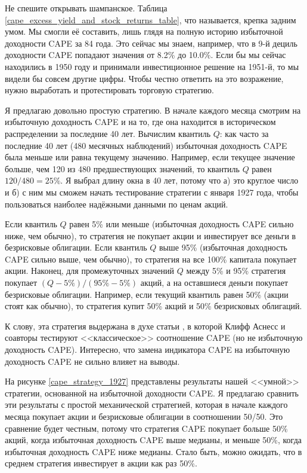 Не спешите открывать шампанское. Таблица 
\ref{cape_excess_yield_and_stock_returns_table}, что называется, крепка задним 
умом. Мы смогли её составить, лишь глядя на полную историю избыточной 
доходности CAPE за 84 года. Это сейчас мы знаем, например, что в 9-й дециль 
доходности CAPE попадают значения от 8.2\% до 10.0\%. Если бы мы сейчас 
находились в 1950 году и принимали инвестиционное решение на 1951-й, то мы 
видели бы совсем другие цифры. Чтобы честно ответить на это возражение, нужно 
выработать и протестировать торговую стратегию.

Я предлагаю довольно простую стратегию. В начале каждого месяца смотрим на 
избыточную доходность CAPE и на то, где она находится в историческом 
распределении за последние 40 лет. Вычислим квантиль $Q$: как часто за 
последние 40 лет (480 месячных наблюдений) избыточная доходность CAPE была 
меньше или равна текущему значению. Например, если текущее значение больше, 
чем 120 из 480 предшествующих значений, то квантиль $Q$ равен
$120/480 = 25\%$. Я выбрал длину окна в 40 лет, потому что а) это круглое 
число и б) с ним мы сможем начать тестирование стратегии с января 1927 года, 
чтобы пользоваться наиболее надёжными данными по ценам акций.

Если квантиль $Q$ равен 5\% или меньше (избыточная доходность CAPE сильно 
ниже, чем обычно), то стратегия не покупает акции и инвестирует все деньги в 
безрисковые облигации. Если квантиль $Q$ выше 95\% (избыточная доходность CAPE 
сильно выше, чем обычно), то стратегия на все 100\% капитала покупает акции. 
Наконец, для промежуточных значений $Q$ между 5\% и 95\% стратегия покупает
$(Q - 5\%) / (95\% - 5\%)$ акций, а на оставшиеся деньги покупает безрисковые 
облигации. Например, если текущий квантиль равен 50\% (акции стоят как
обычно), то стратегия купит 50\% акций и 50\% безрисковых облигаций.

К слову, эта стратегия выдержана в духе статьи \cite{asness2017market}, в 
которой Клифф Аснесс и соавторы тестируют <<классическое>> соотношение CAPE 
(но не избыточную доходность CAPE). Интересно, что замена индикатора CAPE на 
избыточную доходность CAPE не сильно влияет на выводы.

На рисунке \ref{cape_strategy_1927} представлены результаты нашей <<умной>> 
стратегии, основанной на избыточной доходности CAPE. Я предлагаю сравнить эти 
результаты с простой механической стратегией, которая в начале каждого месяца 
покупает акции и безрисковые облигации в соотношении 50/50. Это сравнение 
будет честным, потому что стратегия CAPE покупает больше 50\% акций, когда 
избыточная доходность CAPE выше медианы, и меньше 50\%, когда избыточная 
доходность CAPE ниже медианы. Стало быть, можно ожидать, что в среднем 
стратегия инвестирует в акции как раз 50\%. 

